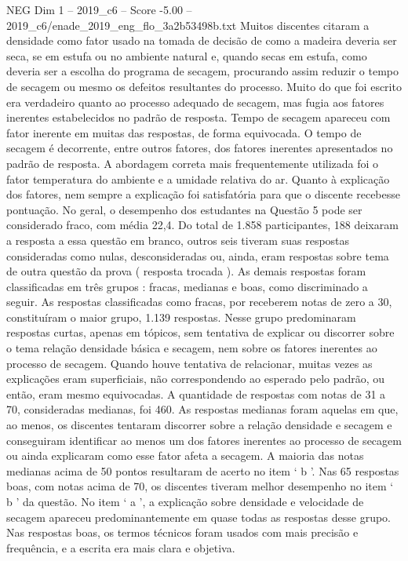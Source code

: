 \begin{textsample}{NEG Dim 1 – 2019\_c6 – Score -5.00 – 2019\_c6/enade\_2019\_eng\_flo\_3a2b53498b.txt}
Muitos discentes citaram a densidade como fator usado na tomada de decisão de como a madeira deveria ser seca, se em estufa ou no ambiente natural e, quando secas em estufa, como deveria ser a escolha do programa de secagem, procurando assim reduzir o tempo de secagem ou mesmo os defeitos resultantes do processo.
Muito do que foi escrito era verdadeiro quanto ao processo adequado de secagem, mas fugia aos fatores inerentes estabelecidos no padrão de resposta.
Tempo de secagem apareceu com fator inerente em muitas das respostas, de forma equivocada.
O tempo de secagem é decorrente, entre outros fatores, dos fatores inerentes apresentados no padrão de resposta.
A abordagem correta mais frequentemente utilizada foi o fator temperatura do ambiente e a umidade relativa do ar.
Quanto à explicação dos fatores, nem sempre a explicação foi satisfatória para que o discente recebesse pontuação.
No geral, o desempenho dos estudantes na Questão 5 pode ser considerado fraco, com média 22,4.
Do total de 1.858 participantes, 188 deixaram a resposta a essa questão em branco, outros seis tiveram suas respostas consideradas como nulas, desconsideradas ou, ainda, eram respostas sobre tema de outra questão da prova ( resposta trocada ).
As demais respostas foram classificadas em três grupos : fracas, medianas e boas, como discriminado a seguir.
As respostas classificadas como fracas, por receberem notas de zero a 30, constituíram o maior grupo, 1.139 respostas.
Nesse grupo predominaram respostas curtas, apenas em tópicos, sem tentativa de explicar ou discorrer sobre o tema relação densidade básica e secagem, nem sobre os fatores inerentes ao processo de secagem.
Quando houve tentativa de relacionar, muitas vezes as explicações eram superficiais, não correspondendo ao esperado pelo padrão, ou então, eram mesmo equivocadas.
A quantidade de respostas com notas de 31 a 70, consideradas medianas, foi 460.
As respostas medianas foram aquelas em que, ao menos, os discentes tentaram discorrer sobre a relação densidade e secagem e conseguiram identificar ao menos um dos fatores inerentes ao processo de secagem ou ainda explicaram como esse fator afeta a secagem.
A maioria das notas medianas acima de 50 pontos resultaram de acerto no item ‘ b ’.
Nas 65 respostas boas, com notas acima de 70, os discentes tiveram melhor desempenho no item ‘ b ’ da questão.
No item ‘ a ’, a explicação sobre densidade e velocidade de secagem apareceu predominantemente em quase todas as respostas desse grupo.
Nas respostas boas, os termos técnicos foram usados com mais precisão e frequência, e a escrita era mais clara e objetiva.

\end{textsample}
